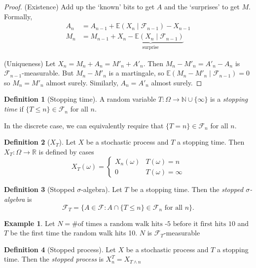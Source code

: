\documentclass[parskip=full]{article}
\theoremstyle{definition}
\newtheorem*{definition}{Definition}
\newtheorem*{example}{Example}
\newcommand{\R}{\mathbb{R}}
\newcommand{\1}{\mathbbm{1}}
\newcommand{\E}{\mathbb{E}}
\begin{document}
\begin{proof}
  (Existence)
  Add up the `known' bits to get $A$ and the `surprises' to get $M$. Formally,
  \begin{align*}
    A_n & = A_{n-1} + \E(X_n \mid \mathcal{F}_{n-1}) - X_{n-1}                            \\
    M_n & = M_{n-1} + \underbrace{X_n - \E(X_n \mid \mathcal{F}_{n-1})}_{\text{surprise}}
  \end{align*}

  (Uniqueness) Let $X_n = M_n + A_n = M'_n + A'_n$. Then $M_n - M'_n = A'_n - A_n$ is $\mathcal{F}_{n-1}$-measurable. But $M_n - M'_n$ is a martingale, so $\E(M_n - M'_n \mid \mathcal{F}_{n-1}) = 0$ so $M_n = M'_n$ almost surely. Similarly, $A_n = A'_n$ almost surely.
\end{proof}

\begin{definition}[Stopping time]
  A random variable $T: \Omega \to \mathbb{N} \cup \{\infty\}$ is a \emph{stopping time} if $\{T \leq n\} \in \mathcal{F}_n$ for all $n$.
\end{definition}
In the discrete case, we can equivalently require that $\{T = n\} \in \mathcal{F}_n$ for all $n$.
\begin{definition}[$X_T$]
  Let $X$ be a stochastic process and $T$ a stopping time. Then $X_T: \Omega \to \R$ is defined by cases
  \[
    X_T(\omega) = \begin{cases}
      X_n(\omega) & T(\omega) = n      \\
      0           & T(\omega) = \infty
    \end{cases}
  \]
\end{definition}

\begin{definition}[Stopped $\sigma$-algebra]
  Let $T$ be a stopping time. Then the \emph{stopped $\sigma$-algebra} is
  \[
    \mathcal{F}_T = \{A \in \mathcal{F}: A \cap \{T \leq n\} \in \mathcal{F}_n \text{ for all } n\}.
  \]
\end{definition}

\begin{example}
  Let $N=\text{\# of times a random walk hits -5 before it first hits 10}$ and $T$ be the first time the random walk hits 10. $N$ is $\mathcal{F}_T$-measurable
\end{example}

\begin{definition}[Stopped process]
  Let $X$ be a stochastic process and $T$ a stopping time. Then the \emph{stopped process} is $X^T_n = X_{T \wedge n}$
\end{definition}
\end{document}
